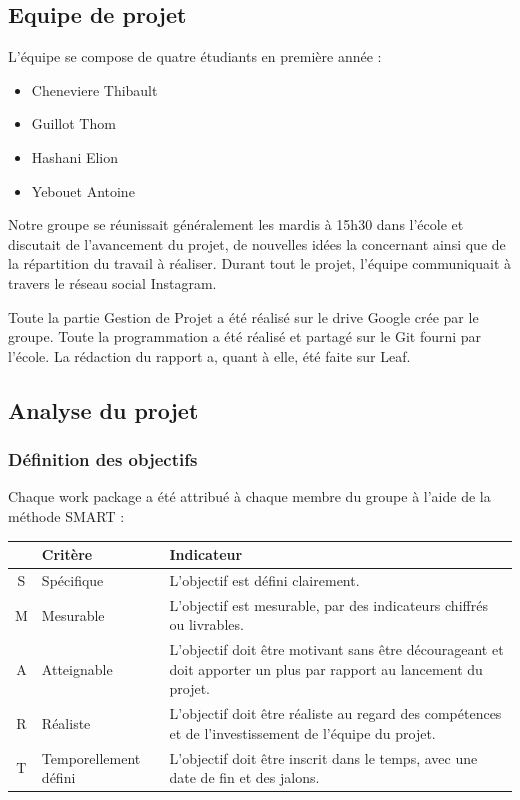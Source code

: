 
\subsection{Equipe de projet}

\noindent
L'équipe se compose de quatre étudiants en première année :

\begin{itemize}
    \item Cheneviere Thibault
    \item Guillot Thom
    \item Hashani Elion
    \item Yebouet Antoine
\end{itemize}

\vskip 0.25cm
\noindent
Notre groupe se réunissait généralement les mardis à 15h30 dans l'école et discutait de l'avancement du projet, de nouvelles idées la concernant ainsi que de la répartition du travail à réaliser. Durant tout le projet, l'équipe communiquait à travers le réseau social Instagram.

\vskip 0.25cm
\noindent
Toute la partie Gestion de Projet a été réalisé sur le drive Google crée par le groupe. Toute la programmation a été réalisé et partagé sur le Git fourni par l'école. La rédaction du rapport a, quant à elle, été faite sur Leaf.

\subsection{Analyse du projet}
    \subsubsection{Définition des objectifs}
    Chaque work package a été attribué à chaque membre du groupe à l'aide de la méthode SMART :
    
    \begin{table}[!ht]
    \begin{tabularx}{\textwidth}{|c|l|X|}
        \hline
          & Critère     & Indicateur  \\
        \hline
        S & Spécifique  & L'objectif est défini clairement. \\
        \hline
        M & Mesurable   & L'objectif est mesurable, par des indicateurs chiffrés ou livrables. \\
        \hline
        A & Atteignable & L'objectif doit être motivant sans être décourageant et doit apporter un plus par rapport au lancement du projet. \\
        \hline
        R & Réaliste    & L'objectif doit être réaliste au regard des compétences et de l'investissement de l'équipe du projet. \\
        \hline
        T & Temporellement défini
                        & L'objectif doit être inscrit dans le temps, avec une date de fin et des jalons. \\
        \hline
    \end{tabularx}
    \label{SMART}
    \end{table}

